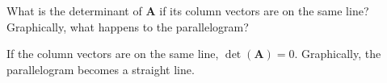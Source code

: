 What is the determinant of $\boldsymbol{A}$ if its column vectors are on the same line? Graphically, what happens to the parallelogram?

\begin{solution}
    If the column vectors are on the same line, $\det\left(\boldsymbol{A}\right) = 0$. Graphically, the parallelogram becomes a straight line.
\end{solution}